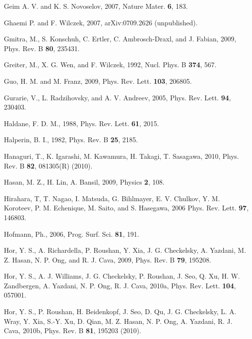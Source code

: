 \documentclass[twocolumn,floatfix,showpacs,rmp,aps]{revtex4}
\begin{document}
\begin{thebibliography}{99}
Geim A. V. and K. S. Novoselov, 2007,
Nature Mater. {\bf 6}, 183.

Ghaemi P. and F. Wilczek, 2007,
arXiv:0709.2626 (unpublished).

Gmitra, M., S. Konschuh, C. Ertler, C. Ambrosch-Draxl, and J. Fabian, 2009,
Phys. Rev. B {\bf 80}, 235431.

Greiter, M., X. G. Wen, and F. Wilczek, 1992,
Nucl. Phys. B {\bf 374}, 567.

Guo, H. M. and M. Franz, 2009,
Phys. Rev. Lett. {\bf 103}, 206805.

Gurarie, V., L. Radzihovsky, and A. V. Andreev, 2005,
Phys. Rev. Lett. {\bf 94}, 230403.

Haldane, F. D. M., 1988,
Phys. Rev. Lett. {\bf 61}, 2015.

Halperin, B. I., 1982,
Phys. Rev. B {\bf 25}, 2185.

Hanaguri, T., K. Igarashi, M. Kawamura, H. Takagi, T. Sasagawa, 2010,
Phys. Rev. B {\bf 82}, 081305(R) (2010).

Hasan, M. Z., H. Lin, A. Bansil, 2009,
Physics {\bf 2}, 108.

Hirahara, T, T. Nagao, I. Matsuda, G. Bihlmayer, E. V. Chulkov,
Y. M. Koroteev, P. M. Echenique, M. Saito, and S. Hasegawa, 2006
Phys. Rev. Lett. {\bf 97}, 146803.

Hofmann, Ph., 2006,
Prog. Surf. Sci. {\bf 81}, 191.

Hor, Y. S., A. Richardella, P. Roushan, Y. Xia, J. G. Checkelsky, A. Yazdani,
M. Z. Hasan, N. P. Ong, and R. J. Cava, 2009,
Phys. Rev. B {\bf 79}, 195208.

Hor, Y. S., A. J. Williams, J. G. Checkelsky, P. Roushan, J. Seo, Q. Xu, H. W. Zandbergen,
A. Yazdani, N. P. Ong, R. J. Cava, 2010a,
Phys. Rev. Lett. {\bf 104}, 057001.

Hor, Y. S., P. Roushan, H. Beidenkopf, J. Seo, D. Qu, J. G. Checkelsky,
L. A. Wray, Y. Xia, S.-Y. Xu, D. Qian, M. Z. Hasan, N. P. Ong,
A. Yazdani, R. J. Cava, 2010b,
Phys. Rev. B {\bf 81}, 195203 (2010).


\end{thebibliography}
\end{document}
